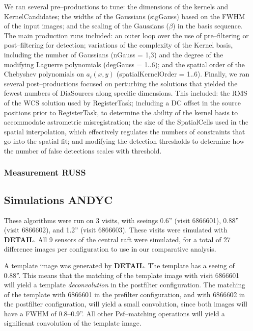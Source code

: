 \documentclass[prd, nofootinbib, floatfix, 11pt,tightenlines,times]{article}
\begin{document}
We ran several pre--productions to tune: the dimensions of the kernels
and KernelCandidates; the widths of the Gaussians (sigGauss) based on
the FWHM of the input images; and the scaling of the Gaussians
($\beta$) in the basis sequence.  The main production runs included:
an outer loop over the use of pre--filtering or post--filtering for
detection; variations of the complexity of the Kernel basis, including
the number of Gaussians (nGauss = 1,3) and the degree of the modifying
Laguerre polynomials (degGauss = 1..6); and the spatial order of the
Chebyshev polynomials on $a_i(x,y)$ (spatialKernelOrder = 1..6).
Finally, we ran several post--productions focused on perturbing the
solutions that yielded the fewest numbers of DiaSources along specific
dimensions.  This included: the RMS of the WCS solution used by
RegisterTask; including a DC offset in the source positions prior to
RegisterTask, to determine the ability of the kernel basis to
accommodate astrometric misregistration; the size of the SpatialCells
used in the spatial interpolation, which effectively regulates the
numbers of constraints that go into the spatial fit; and modifying the
detection thresholds to determine how the number of false detections
scales with threshold.

\subsubsection{Measurement {\bf RUSS}}

\subsection{Simulations {\bf ANDYC}}

These algorithms were run on 3 visits, with seeings 0.6'' (visit
6866601), 0.88'' (visit 6866602), and 1.2'' (visit 6866603).  These
visits were simulated with {\bf DETAIL}.  All 9 sensors of the central
raft were simulated, for a total of 27 difference images per
configuration to use in our comparative analysis.

A template image was generated by {\bf DETAIL}.  The template has a
seeing of 0.88''.  This means that the matching of the template image
with visit 6866601 will yield a template {\it deconvolution} in the
postfilter configuration.  The matching of the template with 6866601
in the prefilter configuration, and with 6866602 in the postfilter
configuration, will yield a small convolution, since both images will
have a FWHM of 0.8--0.9''.  All other Psf--matching operations will
yield a significant convolution of the template image.
\end{document}
